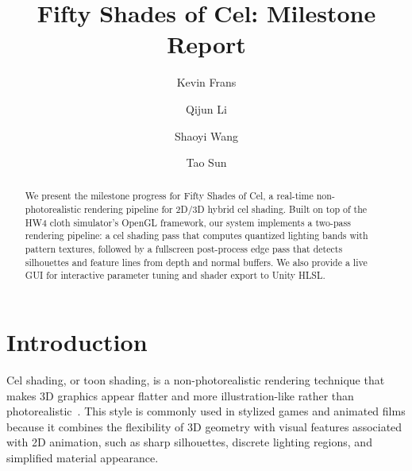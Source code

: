 \documentclass[acmtog,screen]{acmart}
\begin{document}
\title{Fifty Shades of Cel: Milestone Report}

\author{Kevin Frans}

\author{Qijun Li}

\author{Shaoyi Wang}

\author{Tao Sun}

\renewcommand{\shortauthors}{Frans et al.}

\begin{abstract}
We present the milestone progress for Fifty Shades of Cel, a real-time non-photorealistic rendering pipeline for 2D/3D hybrid cel shading. Built on top of the HW4 cloth simulator's OpenGL framework, our system implements a two-pass rendering pipeline: a cel shading pass that computes quantized lighting bands with pattern textures, followed by a fullscreen post-process edge pass that detects silhouettes and feature lines from depth and normal buffers. We also provide a live GUI for interactive parameter tuning and shader export to Unity HLSL.
\end{abstract}


\maketitle

\section{Introduction}

Cel shading, or toon shading, is a non-photorealistic rendering technique that makes 3D graphics appear flatter and more illustration-like rather than photorealistic~\cite{celshading}. This style is commonly used in stylized games and animated films because it combines the flexibility of 3D geometry with visual features associated with 2D animation, such as sharp silhouettes, discrete lighting regions, and simplified material appearance.
\end{document}
